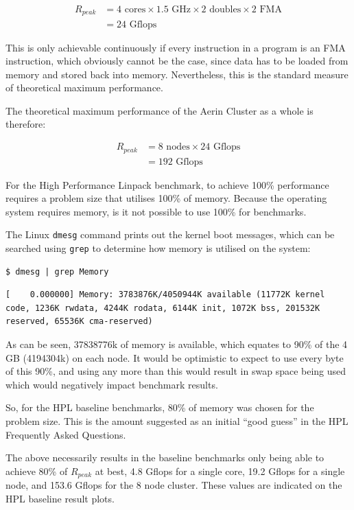 \documentclass{report}
\begin{document}
\begin{align}
R_{peak} &= 4 \textrm{ cores} \times 1.5 \textrm{ GHz} \times 2 \textrm{ doubles} \times 2 \textrm{ FMA}\\
&= 24 \textrm{ Gflops}
\end{align}

This is only achievable continuously if every instruction in a program is an FMA instruction, which obviously cannot be the case, since data has to be loaded from memory and stored back into memory. Nevertheless, this is the standard measure of theoretical maximum performance.

The theoretical maximum performance of the Aerin Cluster as a whole is therefore:

\begin{align}
R_{peak} &= 8 \textrm{ nodes} \times 24 \textrm{ Gflops}\\
&= 192 \textrm{ Gflops}
\end{align}

For the High Performance Linpack benchmark, to achieve 100\% performance requires a problem size that utilises 100\% of memory. Because the operating system requires memory, is it not possible to use 100\% for benchmarks.

The Linux \verb|dmesg| command prints out the kernel boot messages, which can be searched using \verb|grep| to determine how memory is utilised on the system:

\lstset{style=type}
\begin{lstlisting}
$ dmesg | grep Memory
\end{lstlisting}

\lstset{style=type}
\begin{lstlisting}
[    0.000000] Memory: 3783876K/4050944K available (11772K kernel code, 1236K rwdata, 4244K rodata, 6144K init, 1072K bss, 201532K reserved, 65536K cma-reserved)
\end{lstlisting}

As can be seen, 37838776k of memory is available, which equates to 90\% of the 4 GB (4194304k) on each node. It would be optimistic to expect to use every byte of this 90\%, and using any more than this would result in swap space being used which would negatively impact benchmark results.

So, for the HPL baseline benchmarks, 80\% of memory was chosen for the problem size. This is the amount suggested as an initial ``good guess'' in the HPL Frequently Asked Questions.

The above necessarily results in the baseline benchmarks only being able to achieve 80\% of $R_{peak}$ at best, 4.8 Gflops for a single core, 19.2 Gflops for a single node, and 153.6 Gflops for the 8 node cluster. These values are indicated on the HPL baseline result plots.
\end{document}
